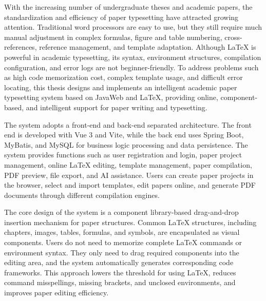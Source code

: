 With the increasing number of undergraduate theses and academic papers, the standardization and efficiency of paper typesetting have attracted growing attention. Traditional word processors are easy to use, but they still require much manual adjustment in complex formulas, figure and table numbering, cross-references, reference management, and template adaptation. Although LaTeX is powerful in academic typesetting, its syntax, environment structures, compilation configuration, and error logs are not beginner-friendly. To address problems such as high code memorization cost, complex template usage, and difficult error locating, this thesis designs and implements an intelligent academic paper typesetting system based on JavaWeb and LaTeX, providing online, component-based, and intelligent support for paper writing and typesetting.

The system adopts a front-end and back-end separated architecture. The front end is developed with Vue 3 and Vite, while the back end uses Spring Boot, MyBatis, and MySQL for business logic processing and data persistence. The system provides functions such as user registration and login, paper project management, online LaTeX editing, template management, paper compilation, PDF preview, file export, and AI assistance. Users can create paper projects in the browser, select and import templates, edit papers online, and generate PDF documents through different compilation engines.

The core design of the system is a component library-based drag-and-drop insertion mechanism for paper structures. Common LaTeX structures, including chapters, images, tables, formulas, and symbols, are encapsulated as visual components. Users do not need to memorize complete LaTeX commands or environment syntax. They only need to drag required components into the editing area, and the system automatically generates corresponding code frameworks. This approach lowers the threshold for using LaTeX, reduces command misspellings, missing brackets, and unclosed environments, and improves paper editing efficiency.